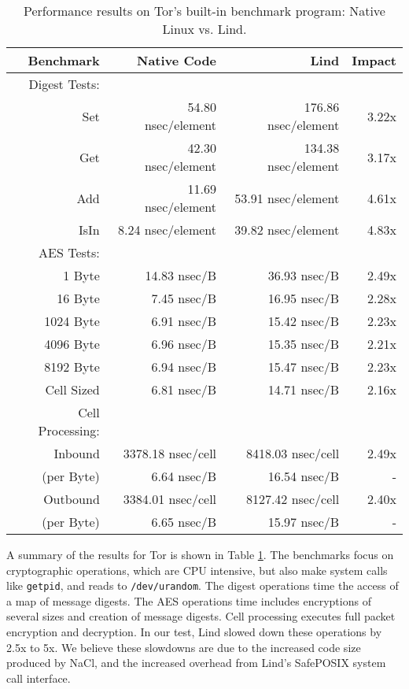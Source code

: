 {{{{\begin{table}
\centering
\scriptsize
\begin{tabular}{|r|r|r|r|}
  \hline
  {\bf Benchmark} & {\bf Native Code} & {\bf Lind} & {\bf Impact}  \\
  \hline
  Digest Tests: & & & \\
  Set & 54.80 nsec/element & 176.86 nsec/element & 3.22x \\
  Get & 42.30 nsec/element & 134.38 nsec/element & 3.17x \\
  Add & 11.69 nsec/element & 53.91 nsec/element & 4.61x \\
  IsIn & 8.24 nsec/element & 39.82 nsec/element & 4.83x \\
  \hline
  AES Tests: & & & \\
  1 Byte & 14.83 nsec/B & 36.93 nsec/B & 2.49x \\
  16 Byte & 7.45 nsec/B & 16.95 nsec/B & 2.28x \\
  1024 Byte & 6.91 nsec/B & 15.42 nsec/B & 2.23x \\
  4096 Byte & 6.96 nsec/B & 15.35 nsec/B & 2.21x \\
  8192 Byte & 6.94 nsec/B & 15.47 nsec/B & 2.23x \\
  Cell Sized & 6.81 nsec/B & 14.71 nsec/B & 2.16x \\
  \hline
  Cell Processing: & & & \\
  Inbound & 3378.18 nsec/cell & 8418.03 nsec/cell & 2.49x \\
  (per Byte) & 6.64 nsec/B & 16.54 nsec/B & - \\
  Outbound & 3384.01 nsec/cell & 8127.42 nsec/cell & 2.40x \\
  (per Byte) & 6.65 nsec/B & 15.97 nsec/B & - \\
  \hline
\end{tabular}
\caption{\small Performance results on Tor's built-in benchmark program: Native
Linux vs. Lind.}
\label{table:performance_tor}
\end{table}

A summary of the results for Tor is shown in Table \ref{table:performance_tor}. The
benchmarks focus on cryptographic operations,
which are CPU intensive, but also make system calls like \texttt{getpid}, and reads to
\texttt{/dev/urandom}.
The digest operations time the access of a map of message digests.
The AES operations time includes encryptions of several sizes and creation of
message digests. Cell processing executes full packet encryption and decryption. In our
test, Lind slowed down these operations by 2.5x to 5x. We believe these
slowdowns are due to the increased code size produced by NaCl,
and the increased overhead from Lind's SafePOSIX system call interface.

}}}}
